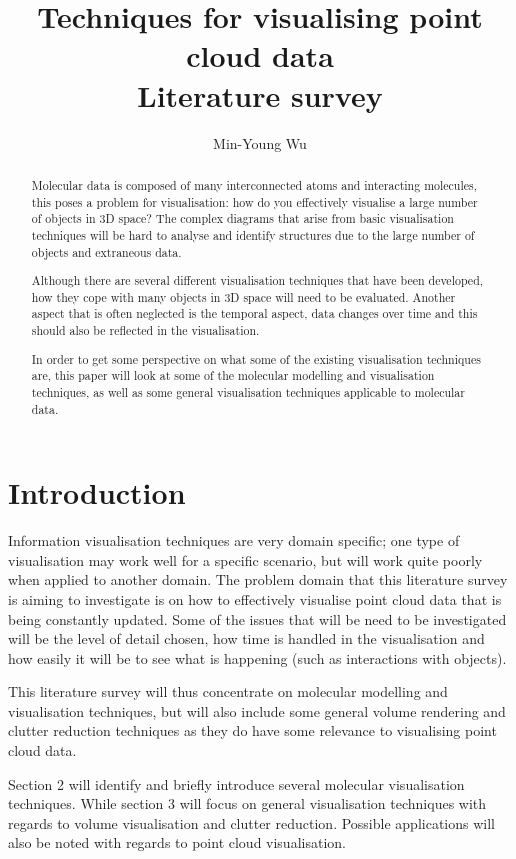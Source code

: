 \documentclass[twocolumn,a4paper]{article}
\title{Techniques for visualising point cloud data \\ Literature survey}
\author{Min-Young Wu}
\begin{document}
\maketitle

\begin{abstract}
Molecular data is composed of many interconnected atoms and interacting
molecules, this poses a problem for visualisation: how do you effectively
visualise a large number of objects in 3D space? The complex diagrams that arise
from basic visualisation techniques will be hard to analyse and identify
structures due to the large number of objects and extraneous data.

Although there are several different visualisation techniques that have been
developed, how they cope with many objects in 3D space will need to be
evaluated. Another aspect that is often neglected is the temporal aspect, data
changes over time and this should also be reflected in the visualisation.

In order to get some perspective on what some of the existing visualisation
techniques are, this paper will look at some of the molecular modelling and
visualisation techniques, as well as some general visualisation techniques
applicable to molecular data.
\end{abstract}


\section{Introduction}

Information visualisation techniques are very domain specific; one type of
visualisation may work well for a specific scenario, but will work quite poorly
when applied to another domain. The problem domain that this literature survey
is aiming to investigate is on how to effectively visualise point cloud data
that is being constantly updated. Some of the issues that will be need to be
investigated will be the level of detail chosen, how time is handled in the
visualisation and how easily it will be to see what is happening (such as
interactions with objects).

This literature survey will thus concentrate on molecular modelling and
visualisation techniques, but will also include some general volume rendering
and clutter reduction techniques as they do have some relevance to visualising
point cloud data.

Section 2 will identify and briefly introduce several molecular visualisation
techniques. While section 3 will focus on general visualisation techniques with
regards to volume visualisation and clutter reduction. Possible applications
will also be noted with regards to point cloud visualisation.
\end{document}

